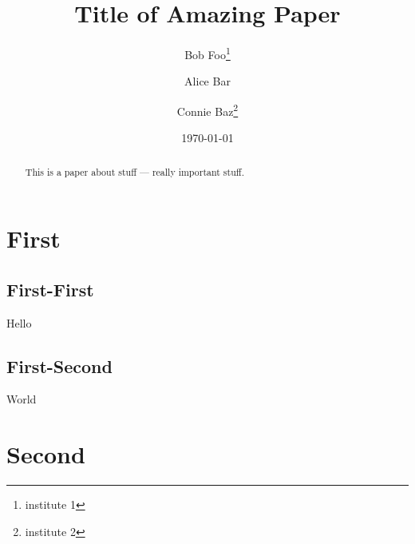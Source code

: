 \documentclass{article}
\title{Title of Amazing Paper}
\date{\today}
\author{Bob Foo\thanks{institute 1} \and Alice Bar\footnotemark[1] \and Connie Baz\footnotemark[1] \thanks{institute 2}}
\begin{document}
 
 \maketitle 
 
  \begin{abstract}
     This is a paper about stuff --- really important stuff.
 \end{abstract}
 
\section{First}
\subsection{First-First}
Hello
\subsection{First-Second}
World 
\section{Second}



 
\end{document}
